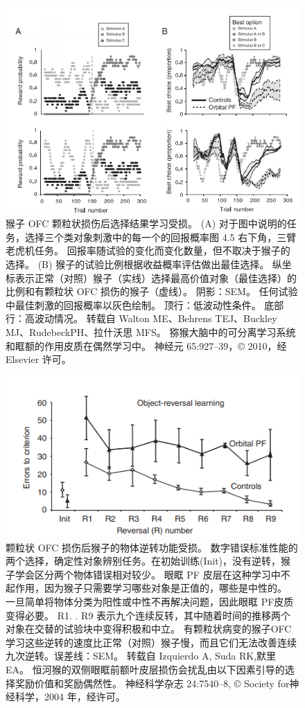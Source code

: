 \begin{figure}[!htb]
	\centering
	\includegraphics{image_pfc/Fig_4_6}
	\caption{猴子 OFC 颗粒状损伤后选择结果学习受损。 (A) 对于图中说明的任务，选择三个类对象刺激中的每一个的回报概率图 4.5 右下角，三臂老虎机任务。 回报率随试验的变化而变化数量，但不取决于猴子的选择。 (B) 猴子的试验比例根据收益概率评估做出最佳选择。 纵坐标表示正常（对照）猴子（实线）选择最高价值对象（最佳选择）的比例和有颗粒状 OFC 损伤的猴子（虚线）。 阴影：SEM。 任何试验中最佳刺激的回报概率以灰色绘制。 顶行：低波动性条件。 底部行：高波动情况。 转载自 Walton ME、Behrens TEJ、Buckley MJ、RudebeckPH、拉什沃思 MFS。 猕猴大脑中的可分离学习系统和眶额的作用皮质在偶然学习中。 神经元 65:927–39，© 2010，经 Elsevier 许可。}
	\label{fig:fig_4_6}
\end{figure}
\begin{figure}[!htb]
	\centering
	\includegraphics{image_pfc/Fig_4_7}
	\caption{颗粒状 OFC 损伤后猴子的物体逆转功能受损。 数字错误标准性能的两个选择，确定性对象辨别任务。在初始训练(Init)，没有逆转，猴子学会区分两个物体错误相对较少。 眼眶 PF 皮层在这种学习中不起作用，因为猴子只需要学习哪些对象是正值的，哪些是中性的。 一旦简单将物体分类为阳性或中性不再解决问题，因此眼眶 PF皮质变得必要。 R1. . R9 表示九个连续反转，其中随着时间的推移两个对象在交替的试验块中变得积极和中立。 有颗粒状病变的猴子OFC 学习这些逆转的速度比正常（对照）猴子慢，而且它们无法改善连续九次逆转。误差线：SEM。 转载自 Izquierdo A, Suda RK,默里EA。 恒河猴的双侧眼眶前额叶皮层损伤会扰乱由以下因素引导的选择奖励价值和奖励偶然性。 神经科学杂志 24:7540–8, © Society for神经科学，2004 年，经许可。}
	\label{fig:fig_4_7}
\end{figure}
